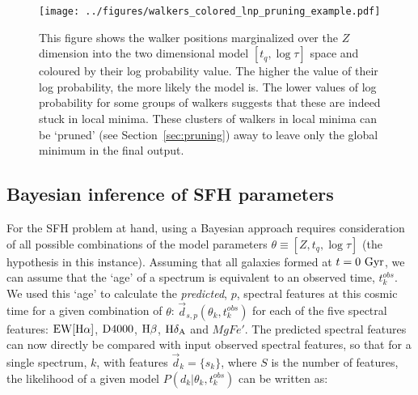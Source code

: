\documentclass[useAMS,usenatbib]{mn2e}
\begin{document}
\begin{figure}
\centering
\texttt{[image: ../figures/walkers\_colored\_lnp\_pruning\_example.pdf]}
\caption{This figure shows the walker positions marginalized over the $Z$ dimension into the two dimensional model $[t_q, \log\tau]$ space and coloured by their log probability value. The higher the value of their log probability, the more likely the model is. The lower values of log probability for some groups of walkers suggests that these are indeed stuck in local minima. These clusters of walkers in local minima can be `pruned' (see Section~\ref{sec:pruning}) away to leave only the global minimum in the final output.}
\label{fig:localminima}
\end{figure}


\subsection{Bayesian inference of SFH parameters}\label{sec:emcee}

For the SFH problem at hand, using a Bayesian approach requires consideration of all possible combinations of the model parameters $\theta \equiv [Z, t_{q}, \log \tau]$ (the hypothesis in this instance). Assuming that all galaxies formed at $t=0~\rm{Gyr}$, we can assume that the `age' of a spectrum is equivalent to an observed time, $t^{obs}_{k}$. We used this  `age' to calculate the \emph{predicted}, $p$, spectral features at this cosmic time for a given combination of $\theta$: $\vec{d}_{s,p}(\theta_k, t^{obs}_{k})$ for each of the five spectral features: $\rm{EW}[H\alpha]$, $\rm{D}4000$, $\rm{H}\beta$, $\rm{H}\delta_A$ and $MgFe'$. The predicted spectral features can now directly be compared with input observed spectral features, so that for a single spectrum, $k$, with features $\vec{d}_{k} = \{s_k\}$, where $S$ is the number of features, the likelihood of a given model $P(d_{k}|\theta_k, t^{obs}_{k})$ can be written as:


\end{document}
